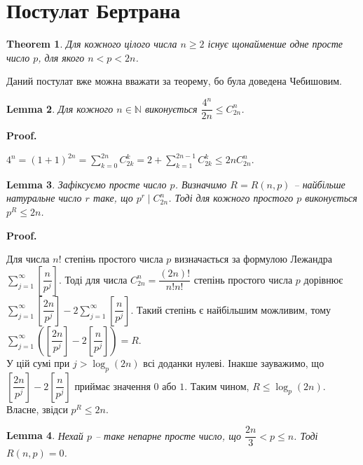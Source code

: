 \documentclass[a4paper, 10pt]{article}
\makeatletter
\theoremstyle{theoremdd}
\newtheorem{theorem}{Theorem}[subsection]
\theoremstyle{theoremdd}
\theoremstyle{theoremdd}
\theoremstyle{theoremdd}
\theoremstyle{theoremdd}
\theoremstyle{theoremdd}
\theoremstyle{theoremdd}
\newtheorem{lemma}[theorem]{Lemma}
\theoremstyle{theoremdd}
\renewenvironment{proof}[1][Proof.\\]{\par
\pushQED{\hfill \qed}%
\normalfont \topsep6\p@\@plus6\p@\relax
\trivlist
\item\relax
{\bfseries
#1\@addpunct{.}}\hspace\labelsep\ignorespaces
}{%
\popQED\endtrivlist\@endpefalse
}
\makeatother
\begin{document}
\section{Постулат Бертрана}
\begin{theorem}
Для кожного цілого числа $n \geq 2$ існує щонайменше одне просте число $p$, для якого $n < p < 2n$.
\end{theorem}

Даний постулат вже можна вважати за теорему, бо була доведена Чебишовим.

\begin{lemma}
Для кожного $n \in \mathbb{N}$ виконується $\dfrac{4^n}{2n} \leq C_{2n}^n$.
\end{lemma}

\begin{proof}
$4^n = (1+1)^{2n} = \displaystyle\sum_{k=0}^{2n} C_{2k}^k = 2 + \sum_{k=1}^{2n-1} C_{2k}^k \leq 2n C_{2n}^n$.
\end{proof}

\begin{lemma}
Зафіксуємо просте число $p$. Визначимо $R = R(n,p)$ -- найбільше натуральне число $r$ таке, що $p^r \mid C_{2n}^n$. Тоді для кожного простого $p$ виконується $p^R \leq 2n$. 
\end{lemma}

\begin{proof}
Для числа $n!$ степінь простого числа $p$ визначається за формулою Лежандра $\displaystyle\sum_{j=1}^\infty \left[ \dfrac{n}{p^j} \right]$. Тоді для числа $C_{2n}^n = \dfrac{(2n)!}{n!n!}$ степінь простого числа $p$ дорівнює $\displaystyle\sum_{j=1}^\infty \left[ \dfrac{2n}{p^j} \right] - 2 \sum_{j=1}^\infty \left[ \dfrac{n}{p^j} \right]$. Такий степінь є найбільшим можливим, тому\\
$\displaystyle\sum_{j=1}^\infty \left( \left[ \dfrac{2n}{p^j} \right] - 2 \left[ \dfrac{n}{p^j} \right] \right) = R$.\\
У цій сумі при $j > \log_p(2n)$ всі доданки нулеві. Інакше зауважимо, що $\left[ \dfrac{2n}{p^j} \right] - 2 \left[ \dfrac{n}{p^j} \right]$ приймає значення $0$ або $1$. Таким чином, $R \leq \log_p (2n)$. Власне, звідси $p^R \leq 2n$.
\end{proof}

\begin{lemma}
Нехай $p$ -- таке непарне просте число, що $\dfrac{2n}{3} < p \leq n$. Тоді $R(n,p) = 0$.
\end{lemma}
\end{document}
